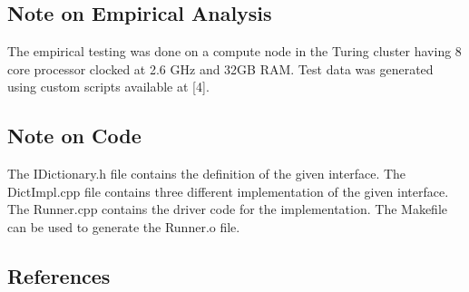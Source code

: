\documentclass[11pt,a4paper,oneside]{article}
\begin{document}
    
    \subsection{Note on Empirical Analysis}
    The empirical testing was done on a compute node in the Turing cluster having 8 core processor clocked at 2.6 GHz and 32GB RAM. Test data was generated using custom scripts available at [4].
    
    \subsection{Note on Code}
    The IDictionary.h file contains the definition of the given interface. The DictImpl.cpp file contains three different implementation of the given interface.  The Runner.cpp contains the driver code for the implementation. The Makefile can be used to generate the Runner.o file.
    
    \subsection{References}
    
\end{document}
